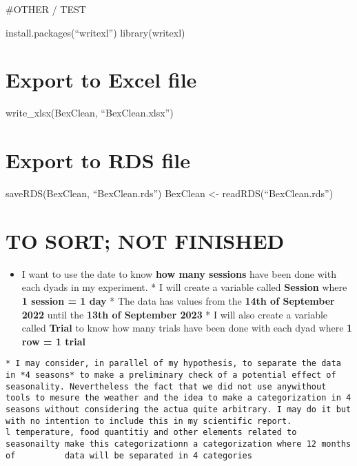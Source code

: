 \documentclass[
]{article}
\providecommand{\tightlist}{%
  \setlength{\itemsep}{0pt}\setlength{\parskip}{0pt}}
\begin{document}
\#OTHER / TEST

install.packages(``writexl'') library(writexl)

\hypertarget{export-to-excel-file}{%
\section{Export to Excel file}\label{export-to-excel-file}}

write\_xlsx(BexClean, ``BexClean.xlsx'')

\hypertarget{export-to-rds-file}{%
\section{Export to RDS file}\label{export-to-rds-file}}

saveRDS(BexClean, ``BexClean.rds'') BexClean \textless-
readRDS(``BexClean.rds'')

\hypertarget{to-sort-not-finished}{%
\section{TO SORT; NOT FINISHED}\label{to-sort-not-finished}}

\begin{itemize}
\tightlist
\item
  I want to use the date to know \textbf{how many sessions} have been
  done with each dyads in my experiment. * I will create a variable
  called \textbf{Session} where \textbf{1 session = 1 day} * The data
  has values from the \textbf{14th of September 2022} until the
  \textbf{13th of September 2023} * I will also create a variable called
  \textbf{Trial} to know how many trials have been done with each dyad
  where \textbf{1 row = 1 trial}
\end{itemize}

\begin{verbatim}
* I may consider, in parallel of my hypothesis, to separate the data in *4 seasons* to make a preliminary check of a potential effect of seasonality. Nevertheless the fact that we did not use anywithout      tools to mesure the weather and the idea to make a categorization in 4 seasons without considering the actua quite arbitrary. I may do it but with no intention to include this in my scientific report.
l temperature, food quantitiy and other elements related to seasonailty make this categorizationn a categorization where 12 months of          data will be separated in 4 categories
\end{verbatim}
\end{document}
